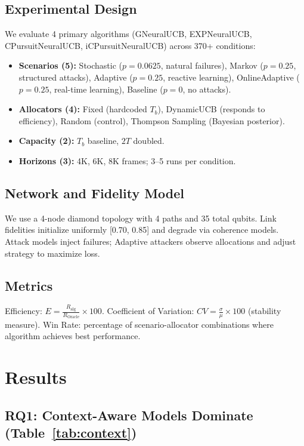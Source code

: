 \documentclass[10pt,twocolumn,journal]{IEEEtran}
\begin{document}
\subsection{Experimental Design}

We evaluate 4 primary algorithms (GNeuralUCB, EXPNeuralUCB, CPursuitNeuralUCB, iCPursuitNeuralUCB) across 370+ conditions:
\begin{itemize}
  \item \textbf{Scenarios (5):} Stochastic ($p=0.0625$, natural failures), Markov ($p=0.25$, structured attacks), Adaptive ($p=0.25$, reactive learning), OnlineAdaptive ($p=0.25$, real-time learning), Baseline ($p=0$, no attacks).
  \item \textbf{Allocators (4):} Fixed (hardcoded $T_b$), DynamicUCB (responds to efficiency), Random (control), Thompson Sampling (Bayesian posterior).
  \item \textbf{Capacity (2):} $T_b$ baseline, $2T$ doubled.
  \item \textbf{Horizons (3):} 4K, 6K, 8K frames; 3--5 runs per condition.
\end{itemize}

\subsection{Network and Fidelity Model}

We use a 4-node diamond topology with 4 paths and 35 total qubits. Link fidelities initialize uniformly [0.70, 0.85] and degrade via coherence models. Attack models inject failures; Adaptive attackers observe allocations and adjust strategy to maximize loss.

\subsection{Metrics}

Efficiency: $E = \frac{R_{\text{alg}}}{R_{\text{Oracle}}} \times 100$. 
Coefficient of Variation: $CV = \frac{\sigma}{\mu} \times 100$ (stability measure).
Win Rate: percentage of scenario-allocator combinations where algorithm achieves best performance.

\section{Results}
\label{sec:results}

\subsection{RQ1: Context-Aware Models Dominate (Table~\ref{tab:context})}
\end{document}
